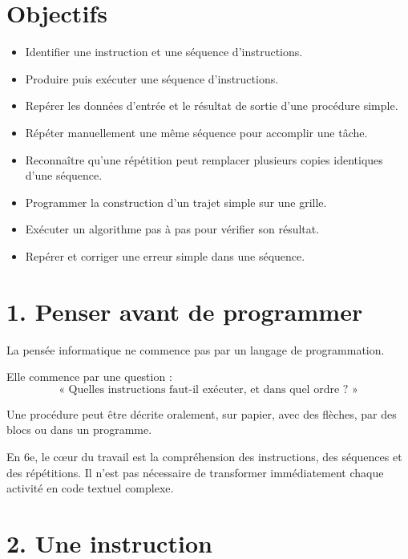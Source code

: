 
\section{Objectifs}

\begin{itemize}
\item Identifier une instruction et une séquence d'instructions.
\item Produire puis exécuter une séquence d'instructions.
\item Repérer les données d'entrée et le résultat de sortie d'une procédure simple.
\item Répéter manuellement une même séquence pour accomplir une tâche.
\item Reconnaître qu'une répétition peut remplacer plusieurs copies identiques d'une séquence.
\item Programmer la construction d'un trajet simple sur une grille.
\item Exécuter un algorithme pas à pas pour vérifier son résultat.
\item Repérer et corriger une erreur simple dans une séquence.
\end{itemize}

\section{1. Penser avant de programmer}

La pensée informatique ne commence pas par un langage de programmation.

Elle commence par une question :
\[
\text{« Quelles instructions faut-il exécuter, et dans quel ordre ? »}
\]

Une procédure peut être décrite oralement, sur papier, avec des flèches, par des blocs ou dans un programme.

\begin{remarque}
En 6e, le cœur du travail est la compréhension des instructions, des séquences et des répétitions. Il n'est pas nécessaire de transformer immédiatement chaque activité en code textuel complexe.
\end{remarque}

\section{2. Une instruction}

